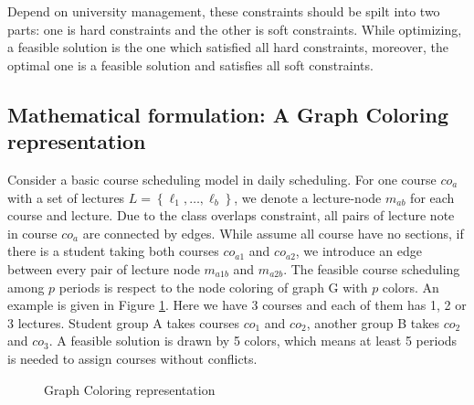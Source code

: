 \documentclass{article}
\begin{document}
Depend on university management, these constraints should be spilt into two parts: one is hard constraints and the other is soft constraints. While optimizing, a feasible solution is the one which satisfied all hard constraints, moreover, the optimal one is a feasible solution and satisfies all soft constraints.


\subsection{Mathematical formulation: A Graph Coloring representation}

Consider a basic course scheduling model in daily scheduling. For one course $co_a$ with a set of lectures $L=\left\{\ell_{1}, \ldots, \ell_{b}\right\}$, we denote a lecture-node $m_{ab}$ for each course and lecture. Due to the class overlaps constraint, all pairs of lecture note in course $co_a$ are connected by edges. While assume all course have no sections, if there is a student taking both courses $co_{a1}$ and $co_{a2}$, we introduce an edge between every pair of lecture node $m_{a1b}$ and $m_{a2b}$. The feasible course scheduling among $p$ periods is respect to the node coloring of graph G with $p$ colors. An example is given in Figure \ref{Fig.main}. Here we have 3 courses and each of them has 1, 2 or 3 lectures. Student group A takes courses $co_1$ and $co_2$, another group B takes $co_2$ and $co_3$. A feasible solution is drawn by 5 colors, which means at least 5 periods is needed to assign courses without conflicts.
\begin{figure}[htbp]
	\centering  %
	\caption{Graph Coloring representation}
	\label{Fig.main}
\end{figure}
\end{document}
